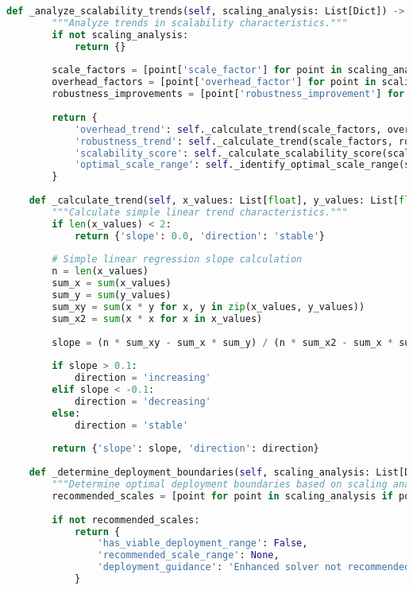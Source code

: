\begin{lstlisting}[language=Python, caption=Scalability Analysis and Deployment Boundary Assessment]
    def _analyze_scalability_trends(self, scaling_analysis: List[Dict]) -> Dict:
        """Analyze trends in scalability characteristics."""
        if not scaling_analysis:
            return {}
        
        scale_factors = [point['scale_factor'] for point in scaling_analysis]
        overhead_factors = [point['overhead_factor'] for point in scaling_analysis]
        robustness_improvements = [point['robustness_improvement'] for point in scaling_analysis]
        
        return {
            'overhead_trend': self._calculate_trend(scale_factors, overhead_factors),
            'robustness_trend': self._calculate_trend(scale_factors, robustness_improvements),
            'scalability_score': self._calculate_scalability_score(scaling_analysis),
            'optimal_scale_range': self._identify_optimal_scale_range(scaling_analysis)
        }
    
    def _calculate_trend(self, x_values: List[float], y_values: List[float]) -> Dict:
        """Calculate simple linear trend characteristics."""
        if len(x_values) < 2:
            return {'slope': 0.0, 'direction': 'stable'}
        
        # Simple linear regression slope calculation
        n = len(x_values)
        sum_x = sum(x_values)
        sum_y = sum(y_values)
        sum_xy = sum(x * y for x, y in zip(x_values, y_values))
        sum_x2 = sum(x * x for x in x_values)
        
        slope = (n * sum_xy - sum_x * sum_y) / (n * sum_x2 - sum_x * sum_x) if (n * sum_x2 - sum_x * sum_x) != 0 else 0.0
        
        if slope > 0.1:
            direction = 'increasing'
        elif slope < -0.1:
            direction = 'decreasing'
        else:
            direction = 'stable'
        
        return {'slope': slope, 'direction': direction}
    
    def _determine_deployment_boundaries(self, scaling_analysis: List[Dict]) -> Dict:
        """Determine optimal deployment boundaries based on scaling analysis."""
        recommended_scales = [point for point in scaling_analysis if point['deployment_recommended']]
        
        if not recommended_scales:
            return {
                'has_viable_deployment_range': False,
                'recommended_scale_range': None,
                'deployment_guidance': 'Enhanced solver not recommended at tested scales'
            }
        

\end{lstlisting}
